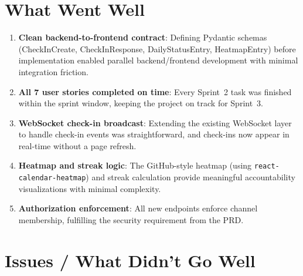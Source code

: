 \documentclass[11pt]{article}
\begin{document}
\section{What Went Well}

\begin{enumerate}[leftmargin=1.5em]
    \item \textbf{Clean backend-to-frontend contract}: Defining Pydantic schemas (CheckInCreate, CheckInResponse, DailyStatusEntry, HeatmapEntry) before implementation enabled parallel backend/frontend development with minimal integration friction.

    \item \textbf{All 7 user stories completed on time}: Every Sprint~2 task was finished within the sprint window, keeping the project on track for Sprint~3.

    \item \textbf{WebSocket check-in broadcast}: Extending the existing WebSocket layer to handle check-in events was straightforward, and check-ins now appear in real-time without a page refresh.

    \item \textbf{Heatmap and streak logic}: The GitHub-style heatmap (using \texttt{react-calendar-heatmap}) and streak calculation provide meaningful accountability visualizations with minimal complexity.

    \item \textbf{Authorization enforcement}: All new endpoints enforce channel membership, fulfilling the security requirement from the PRD.
\end{enumerate}

\section{Issues / What Didn't Go Well}
\end{document}
